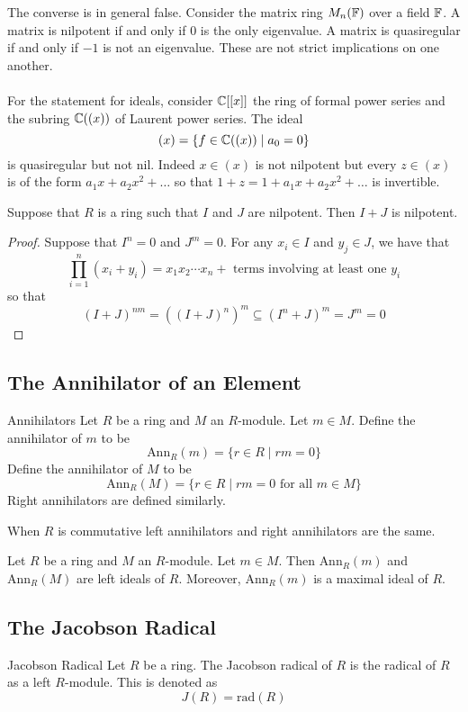 \documentclass[a4paper]{article}
\begin{document}
The converse is in general false. Consider the matrix ring $M_n(\mathbb{F})$ over a field $\mathbb{F}$. A matrix is nilpotent if and only if $0$ is the only eigenvalue. A matrix is quasiregular if and only if $-1$ is not an eigenvalue. These are not strict implications on one another. \\~\\

For the statement for ideals, consider $\mathbb{C}[[x]]$ the ring of formal power series and the subring $\mathbb{C}((x))$ of Laurent power series. The ideal $$(x)=\{f\in\mathbb{C}((x))\;|\;a_0=0\}$$ is quasiregular but not nil. Indeed $x\in(x)$ is not nilpotent but every $z\in(x)$ is of the form $a_1x+a_2x^2+\dots$ so that $1+z=1+a_1x+a_2x^2+\dots$ is invertible. 

\begin{prp}{}{} Suppose that $R$ is a ring such that $I$ and $J$ are nilpotent. Then $I+J$ is nilpotent. \tcbline
\begin{proof}
Suppose that $I^n=0$ and $J^m=0$. For any $x_i\in I$ and $y_j\in J$, we have that $$\prod_{i=1}^n(x_i+y_i)=x_1x_2\cdots x_n+\text{ terms involving at least one }y_i$$ so that $$(I+J)^{nm}=((I+J)^n)^m\subseteq(I^n+J)^m=J^m=0$$
\end{proof}
\end{prp}

\subsection{The Annihilator of an Element}
\begin{defn}{Annihilators}{} Let $R$ be a ring and $M$ an $R$-module. Let $m\in M$. Define the annihilator of $m$ to be $$\text{Ann}_R(m)=\{r\in R\;|\;rm=0\}$$ Define the annihilator of $M$ to be $$\text{Ann}_R(M)=\{r\in R\;|\;rm=0\text{ for all }m\in M\}$$ Right annihilators are defined similarly. 
\end{defn}

When $R$ is commutative left annihilators and right annihilators are the same. 

\begin{lmm}{}{} Let $R$ be a ring and $M$ an $R$-module. Let $m\in M$. Then $\text{Ann}_R(m)$ and $\text{Ann}_R(M)$ are left ideals of $R$. Moreover, $\text{Ann}_R(m)$ is a maximal ideal of $R$. 
\end{lmm}

\subsection{The Jacobson Radical}
\begin{defn}{Jacobson Radical}{} Let $R$ be a ring. The Jacobson radical of $R$ is the radical of $R$ as a left $R$-module. This is denoted as $$J(R)=\text{rad}(R)$$
\end{defn}
\end{document}
